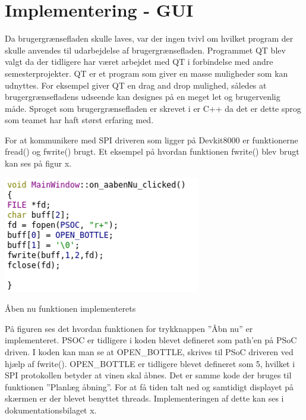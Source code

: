 \section{Implementering - GUI}

Da brugergrænsefladen skulle laves, var der ingen tvivl om hvilket program der skulle anvendes til udarbejdelse af brugergrænsefladen. Programmet QT blev valgt da der tidligere har været arbejdet med QT i forbindelse med andre semesterprojekter. QT er et program som giver en masse muligheder som kan udnyttes. For eksempel giver QT en drag and drop mulighed, således at brugergrænsefladens udseende kan designes på en meget let og brugervenlig måde.
Sproget som brugergrænsefladen er skrevet i er C++ da det er dette sprog som teamet har haft størst erfaring med.

For at kommunikere med SPI driveren som ligger på Devkit8000 er funktionerne fread() og fwrite() brugt. Et eksempel på hvordan funktionen fwrite() blev brugt kan ses på figur x.

\includegraphics{Billeder/kodeeksempel}
\caption{Åben nu funktionen implementerets}

På figuren ses det hvordan funktionen for trykknappen ”Åbn nu” er implementeret. PSOC er tidligere i koden blevet defineret som path’en på PSoC driven. I koden kan man se at OPEN_BOTTLE, skrives til PSoC driveren ved hjælp af fwrite(). OPEN_BOTTLE er tidligere blevet defineret som 5, hvilket i SPI protokollen betyder at vinen skal åbnes. Det er samme kode der bruges til funktionen ”Planlæg åbning”.
For at få tiden talt ned og samtidigt displayet på skærmen er der blevet benyttet threads. Implementeringen af dette kan ses i dokumentationsbilaget x.
